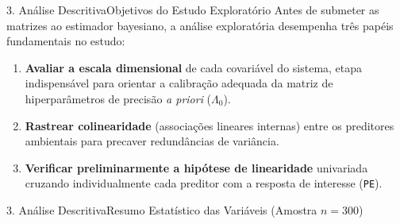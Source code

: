 \documentclass[10pt,aspectratio=169]{beamer}
\begin{document}
\begin{frame}{3. Análise Descritiva}{Objetivos do Estudo Exploratório}
    Antes de submeter as matrizes ao estimador bayesiano, a análise exploratória desempenha três papéis fundamentais no estudo:
    \begin{enumerate}
        \item \textbf{Avaliar a escala dimensional} de cada covariável do sistema, etapa indispensável para orientar a calibração adequada da matriz de hiperparâmetros de precisão \textit{a priori} ($\Lambda_0$).
        \item \textbf{Rastrear colinearidade} (associações lineares internas) entre os preditores ambientais para precaver redundâncias de variância.
        \item \textbf{Verificar preliminarmente a hipótese de linearidade} univariada cruzando individualmente cada preditor com a resposta de interesse (\texttt{PE}).
    \end{enumerate}
\end{frame}

\begin{frame}{3. Análise Descritiva}{Resumo Estatístico das Variáveis (Amostra $n=300$)}
    \begin{table}
        \centering
        \caption{Medidas de Posição, Distribuição e Quartis}
        \label{tab:resumo}
    \end{table}
\end{frame}
\end{document}
